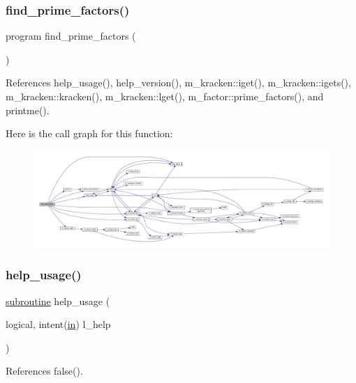 \subsubsection{\texorpdfstring{find\+\_\+prime\+\_\+factors()}{find\_prime\_factors()}}
{\footnotesize\ttfamily program find\+\_\+prime\+\_\+factors (\begin{DoxyParamCaption}{ }\end{DoxyParamCaption})}



References help\+\_\+usage(), help\+\_\+version(), m\+\_\+kracken\+::iget(), m\+\_\+kracken\+::igets(), m\+\_\+kracken\+::kracken(), m\+\_\+kracken\+::lget(), m\+\_\+factor\+::prime\+\_\+factors(), and printme().

Here is the call graph for this function\+:
\nopagebreak
\begin{figure}[H]
\begin{center}
\leavevmode
\includegraphics[width=350pt]{factors_8f90_a01d59471a125202c8c43d68f82dd84f9_cgraph}
\end{center}
\end{figure}
\mbox{\label{factors_8f90_a3e09a3b52ee8fb04eeb93fe5761626a8}} 
\subsubsection{\texorpdfstring{help\+\_\+usage()}{help\_usage()}}
{\footnotesize\ttfamily \hyperlink{M__stopwatch_83_8txt_acfbcff50169d691ff02d4a123ed70482}{subroutine} help\+\_\+usage (\begin{DoxyParamCaption}\item[{logical, intent(\hyperlink{M__journal_83_8txt_afce72651d1eed785a2132bee863b2f38}{in})}]{l\+\_\+help }\end{DoxyParamCaption})}



References false().


